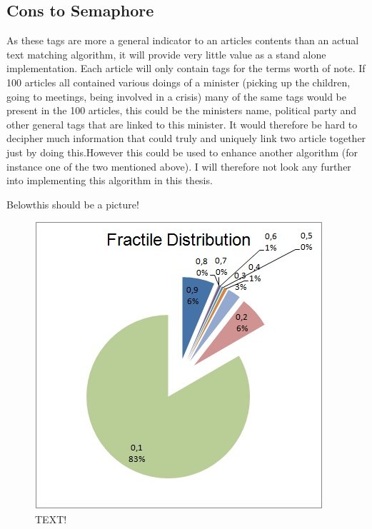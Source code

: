 \subsection{Cons to Semaphore}
As these tags are more a general indicator to an articles contents than an actual text matching algorithm, it will provide very little value as a stand alone implementation. Each article will only contain tags for the terms worth of note. If 100 articles all contained various doings of a minister (picking up the children, going to meetings, being involved in a crisis) many of the same tags would be present in the 100 articles, this could be the ministers name, political party and other general tags that are linked to this minister. It would therefore be hard to decipher much information that could truly and uniquely link two article together just by doing this.However this could be used to enhance another algorithm (for instance one of the two mentioned above). I will therefore not look any further into implementing this algorithm in this thesis.

Belowthis should be a picture!
\begin{figure}[hb]
	\centering
	\includegraphics[scale=1.0]{figures/JV-Lemvig}
	\caption{TEXT!}
\end{figure}







